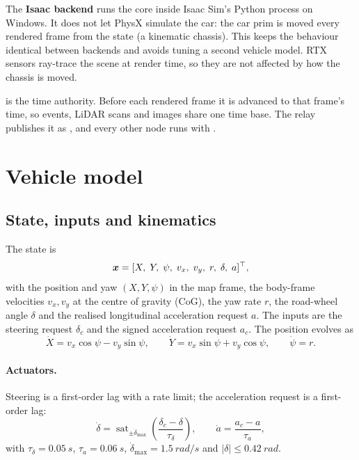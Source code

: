 \documentclass[11pt]{article}
\begin{document}
The \textbf{Isaac backend} runs the core inside Isaac Sim's Python process on Windows. It does not let PhysX
simulate the car: the car prim is moved every rendered frame from the  state (a kinematic chassis).
This keeps the behaviour identical between backends and avoids tuning a second vehicle model. RTX sensors
ray-trace the scene at render time, so they are not affected by how the chassis is moved.

 is the time authority. Before each rendered frame it is advanced to that frame's time, so events,
LiDAR scans and images share one time base. The relay publishes it as , and every other node runs with
.

\section{Vehicle model}\label{sec:vehicle}
\subsection{State, inputs and kinematics}
The state is
\begin{equation}
\bm{x} = [X,\;Y,\;\psi,\;v_x,\;v_y,\;r,\;\delta,\;a]^\top,
\end{equation}
with the position and yaw $(X,Y,\psi)$ in the map frame, the body-frame velocities $v_x, v_y$ at the centre of
gravity (CoG), the yaw rate $r$, the road-wheel angle $\delta$ and the realised longitudinal acceleration request
$a$. The inputs are the steering request $\delta_c$ and the signed acceleration request $a_c$. The position
evolves as
\begin{equation}
\dot X = v_x\cos\psi - v_y\sin\psi,\qquad \dot Y = v_x\sin\psi + v_y\cos\psi,\qquad \dot\psi = r .
\end{equation}

\paragraph{Actuators.} Steering is a first-order lag with a rate limit; the acceleration request is a first-order
lag:
\begin{equation}
\dot\delta = \operatorname{sat}_{\pm\dot\delta_{\max}}\!\left(\frac{\delta_c-\delta}{\tau_\delta}\right),\qquad
\dot a = \frac{a_c - a}{\tau_a},
\end{equation}
with $\tau_\delta=\SI{0.05}{s}$, $\tau_a=\SI{0.06}{s}$, $\dot\delta_{\max}=\SI{1.5}{rad/s}$ and
$|\delta|\le\SI{0.42}{rad}$.
\end{document}

